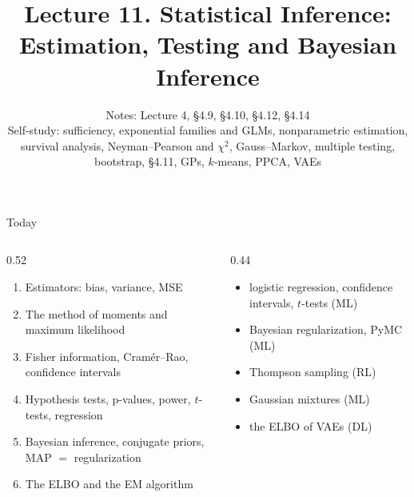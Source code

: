 \documentclass[aspectratio=1610,11pt]{beamer}
\title[Lecture 11 · Statistical Inference]{Lecture 11. Statistical Inference:\\ Estimation, Testing and Bayesian Inference}
\subtitle{Notes: Lecture 4, \S4.9, \S4.10, \S4.12, \S4.14\\ Self-study: sufficiency, exponential families and GLMs, nonparametric estimation, survival analysis, Neyman--Pearson and $\chi^2$, Gauss--Markov, multiple testing, bootstrap, \S4.11, GPs, $k$-means, PPCA, VAEs}
\begin{document}
\begin{frame}[plain]
    \titlepage
\end{frame}

\begin{frame}{Today}
    \begin{columns}[T]
        \begin{column}{0.52\linewidth}
            \begin{enumerate}\small
                \item Estimators: bias, variance, MSE
                \item The method of moments and maximum likelihood
                \item Fisher information, Cram\'er--Rao, confidence intervals
                \item Hypothesis tests, p-values, power, $t$-tests, regression
                \item Bayesian inference, conjugate priors, MAP $=$ regularization
                \item The ELBO and the EM algorithm
            \end{enumerate}
        \end{column}
        \begin{column}{0.44\linewidth}
            \begin{mlbox}[Used in]
                \small
                \begin{itemize}
                    \item logistic regression, confidence intervals, $t$-tests (ML)
                    \item Bayesian regularization, PyMC (ML)
                    \item Thompson sampling (RL)
                    \item Gaussian mixtures (ML)
                    \item the ELBO of VAEs (DL)
                \end{itemize}
            \end{mlbox}
        \end{column}
    \end{columns}
\end{frame}
\end{document}
